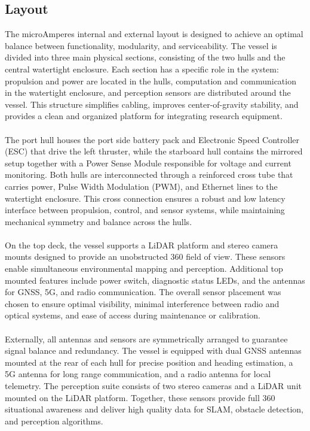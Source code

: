 \subsection{Layout}
The microAmperes internal and external layout is designed to achieve an optimal balance between functionality, modularity, and serviceability. The vessel is divided into three main physical sections, consisting of the two hulls and the central watertight enclosure. Each section has a specific role in the system: propulsion and power are located in the hulls, computation and communication in the watertight enclosure, and perception sensors are distributed around the vessel. This structure simplifies cabling, improves center-of-gravity stability, and provides a clean and organized platform for integrating research equipment.
\\ \\
The port hull houses the port side battery pack and Electronic Speed Controller (ESC) that drive the left thruster, while the starboard hull contains the mirrored setup together with a Power Sense Module responsible for voltage and current monitoring. Both hulls are interconnected through a reinforced cross tube that carries power, Pulse Width Modulation (PWM), and Ethernet lines to the watertight enclosure. This cross connection ensures a robust and low latency interface between propulsion, control, and sensor systems, while maintaining mechanical symmetry and balance across the hulls.
\\ \\
On the top deck, the vessel supports a LiDAR platform and stereo camera mounts designed to provide an unobstructed 360\textdegree{} field of view. These sensors enable simultaneous environmental mapping and perception. Additional top mounted features include power switch, diagnostic status LEDs, and the antennas for GNSS, 5G, and radio communication. The overall sensor placement was chosen to ensure optimal visibility, minimal interference between radio and optical systems, and ease of access during maintenance or calibration.
\\ \\
Externally, all antennas and sensors are symmetrically arranged to guarantee signal balance and redundancy. The vessel is equipped with dual GNSS antennas mounted at the rear of each hull for precise position and heading estimation, a 5G antenna for long range communication, and a radio antenna for local telemetry. The perception suite consists of two stereo cameras and a LiDAR unit mounted on the LiDAR platform. Together, these sensors provide full 360\textdegree{} situational awareness and deliver high quality data for SLAM, obstacle detection, and perception algorithms.
